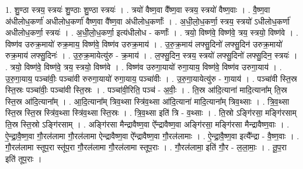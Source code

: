 \documentclass[17pt]{extarticle}
\begin{document}
1. शु॒ण्ठा स्त्रय॒ स्त्रयः॑ शु॒ण्ठाः शु॒ण्ठा स्त्रयः॑ । . त्रयो॑ वैष्ण॒वा वै᳚ष्ण॒वा स्त्रय॒ स्त्रयो॑ वैष्ण॒वाः । . वै॒ष्ण॒वा अ॑धीलोध॒कर्णा॑ अधीलोध॒कर्णा॑ वैष्ण॒वा वै᳚ष्ण॒वा अ॑धीलोध॒कर्णाः᳚ । . अ॒धी॒लो॒ध॒कर्णा॒ स्त्रय॒ स्त्रयो॑ ऽधीलोध॒कर्णा॑ अधीलोध॒कर्णा॒ स्त्रयः॑ । . अ॒धी॒लो॒ध॒कर्णा॒ इत्य॑धीलोध - कर्णाः᳚ । . त्रयो॒ विष्ण॑वे॒ विष्ण॑वे॒ त्रय॒ स्त्रयो॒ विष्ण॑वे । . विष्ण॑व उरुक्र॒मायो॑ रुक्र॒माय॒ विष्ण॑वे॒ विष्ण॑व उरुक्र॒माय॑ । . उ॒रु॒क्र॒माय॑ लफ्सु॒दिनो॑ लफ्सु॒दिन॑ उरुक्र॒मायो॑ रुक्र॒माय॑ लफ्सु॒दिनः॑ । . उ॒रु॒क्र॒मायेत्यु॑रु - क्र॒माय॑ । . ल॒फ्सु॒दिन॒ स्त्रय॒ स्त्रयो॑ लफ्सु॒दिनो॑ लफ्सु॒दिन॒ स्त्रयः॑ । . त्रयो॒ विष्ण॑वे॒ विष्ण॑वे॒ त्रय॒ स्त्रयो॒ विष्ण॑वे । . विष्ण॑व उरुगा॒यायो॑ रुगा॒याय॒ विष्ण॑वे॒ विष्ण॑व उरुगा॒याय॑ । . उ॒रु॒गा॒याय॒ पञ्चा॑वीः॒ पञ्चा॑वी रुरुगा॒यायो॑ रुगा॒याय॒ पञ्चा॑वीः । . उ॒रु॒गा॒यायेत्यु॑रु - गा॒याय॑ । . पञ्चा॑वी स्ति॒स्र स्ति॒स्रः पञ्चा॑वीः॒ पञ्चा॑वी स्ति॒स्रः । . पञ्चा॑वी॒रिति॒ पञ्च॑ - अ॒वीः॒ । . ति॒स्र आ॑दि॒त्याना॑ मादि॒त्याना᳚म् ति॒स्र स्ति॒स्र आ॑दि॒त्याना᳚म् । . आ॒दि॒त्याना᳚म् त्रिव॒थ्सा स्त्रि॑व॒थ्सा आ॑दि॒त्याना॑ मादि॒त्याना᳚म् त्रिव॒थ्साः । . त्रि॒व॒थ्सा स्ति॒स्र स्ति॒स्र स्त्रि॑व॒थ्सा स्त्रि॑व॒थ्सा स्ति॒स्रः । . त्रि॒व॒थ्सा इति॑ त्रि - व॒थ्साः । . ति॒स्रो ऽङ्गि॑रसा॒ मङ्गि॑रसाम् ति॒स्र स्ति॒स्रो ऽङ्गि॑रसाम् । . अङ्गि॑रसा मैन्द्रावैष्ण॒वा ऐ᳚न्द्रावैष्ण॒वा अङ्गि॑रसा॒ मङ्गि॑रसा मैन्द्रावैष्ण॒वाः । . ऐ॒न्द्रा॒वै॒ष्ण॒वा गौ॒रल॑लामा गौ॒रल॑लामा ऐन्द्रावैष्ण॒वा ऐ᳚न्द्रावैष्ण॒वा गौ॒रल॑लामाः । . ऐ॒न्द्रा॒वै॒ष्ण॒वा इत्यै᳚न्द्रा - वै॒ष्ण॒वाः । . गौ॒रल॑लामा स्तूप॒रा स्तू॑प॒रा गौ॒रल॑लामा गौ॒रल॑लामा स्तूप॒राः । . गौ॒रल॑लामा॒ इति॑ गौ॒र - ल॒ला॒माः॒ । . तू॒प॒रा इति॑ तूप॒राः । \newline
\end{document}
